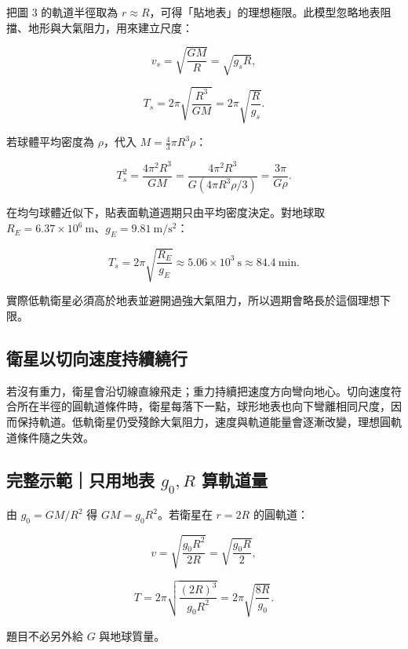\documentclass[11pt,a4paper]{article}
\begin{document}
把圖 3 的軌道半徑取為 \(r\approx R\)，可得「貼地表」的理想極限。此模型忽略地表阻擋、地形與大氣阻力，用來建立尺度：

\[
\boxed{v_s=\sqrt{\frac{GM}{R}}=\sqrt{g_sR}},
\]

\[
\boxed{T_s=2\pi\sqrt{\frac{R^3}{GM}}
=2\pi\sqrt{\frac{R}{g_s}}}.
\]

若球體平均密度為 \(\rho\)，代入 \(M=\tfrac43\pi R^3\rho\)：

\[
T_s^2
=\frac{4\pi^2R^3}{GM}
=\frac{4\pi^2R^3}{G(4\pi R^3\rho/3)}
=\boxed{\frac{3\pi}{G\rho}}.
\]

在均勻球體近似下，貼表面軌道週期只由平均密度決定。對地球取 \(R_E=6.37\times10^6\ \mathrm m\)、\(g_E=9.81\ \mathrm{m/s^2}\)：

\[
T_s=2\pi\sqrt{\frac{R_E}{g_E}}
\approx5.06\times10^3\ \mathrm s
\approx\boxed{84.4\ \mathrm{min}}.
\]

實際低軌衛星必須高於地表並避開過強大氣阻力，所以週期會略長於這個理想下限。

\subsection{衛星以切向速度持續繞行}\label{ux885bux661fux4ee5ux5207ux5411ux901fux5ea6ux6301ux7e8cux7e5eux884c}

若沒有重力，衛星會沿切線直線飛走；重力持續把速度方向彎向地心。切向速度符合所在半徑的圓軌道條件時，衛星每落下一點，球形地表也向下彎離相同尺度，因而保持軌道。低軌衛星仍受殘餘大氣阻力，速度與軌道能量會逐漸改變，理想圓軌道條件隨之失效。

\begin{HandoutWorkedExample}

\subsection{\texorpdfstring{完整示範｜只用地表 \(g_0,R\) 算軌道量}{完整示範｜只用地表 g\_0,R 算軌道量}}\label{ux5b8cux6574ux793aux7bc4ux53eaux7528ux5730ux8868-g_0r-ux7b97ux8eccux9053ux91cf}

由 \(g_0=GM/R^2\) 得 \(GM=g_0R^2\)。若衛星在 \(r=2R\) 的圓軌道：

\[
v=\sqrt{\frac{g_0R^2}{2R}}
=\sqrt{\frac{g_0R}{2}},
\]

\[
T=2\pi\sqrt{\frac{(2R)^3}{g_0R^2}}
=2\pi\sqrt{\frac{8R}{g_0}}.
\]

題目不必另外給 \(G\) 與地球質量。

\end{HandoutWorkedExample}
\end{document}
